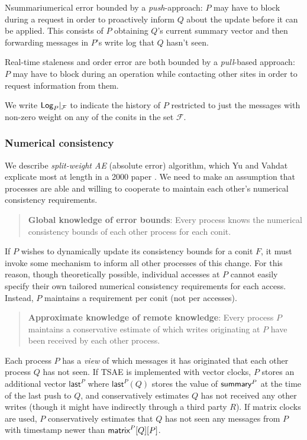 \documentclass[]             %
{NASA}                       %
\theoremstyle{definition}
\begin{document}
Nsummariumerical error bounded by a \emph{push}-approach: $P$ may have to
block during a request in order to proactively inform $Q$ about the
update before it can be applied. This consists of $P$ obtaining $Q$'s
current summary vector and then forwarding messages in $P$'s write log
that $Q$ hasn't seen.

Real-time staleness and order error are both bounded by a
\emph{pull}-based approach: $P$ may have to block during an operation
while contacting other sites in order to request information from
them.

We write $\textsf{Log}_{P}|_\mathcal{F}$ to indicate the history of $P$
restricted to just the messages with non-zero weight on any of the
conits in the set $\mathcal{F}$.

\subsubsection{Numerical consistency}
\label{numerical-consistency}

We describe \emph{split-weight AE} (absolute error) algorithm, which
Yu and Vahdat explicate most at length in a 2000 paper
\cite{2000tactalgorithms}. We need to make an assumption that
processes are able and willing to cooperate to maintain each other's
numerical consistency requirements.
\begin{quote}
  \textbf{Global knowledge of error bounds}: Every process knows the
  numerical consistency bounds of each other process for each conit.
\end{quote}
If $P$ wishes to dynamically update its consistency bounds for a conit
$F$, it must invoke some mechanism to inform all other processes of
this change. For this reason, though theoretically possible,
individual accesses at $P$ cannot easily specify their own tailored
numerical consistency requirements for each access. Instead, $P$
maintains a requirement per conit (not per accesses).
\begin{quote}
  \textbf{Approximate knowledge of remote knowledge}: Every process
  $P$ maintains a conservative estimate of which writes originating at
  $P$ have been received by each other process.
\end{quote}

Each process $P$ has a \emph{view} of which messages it has originated
that each other process $Q$ has not seen. If TSAE is implemented with
vector clocks, $P$ stores an additional vector $\mathsf{last}^P$ where
$\mathsf{last}^P(Q)$ stores the value of $\textsf{summary}^{P}$ at the time
of the last push to $Q$, and conservatively estimates $Q$ has not
received any other writes (though it might have indirectly through a
third party $R$). If matrix clocks are used, $P$ conservatively
estimates that $Q$ has not seen any messages from $P$ with timestamp
newer than $\textsf{matrix}^{P}[Q][P]$.
\end{document}
